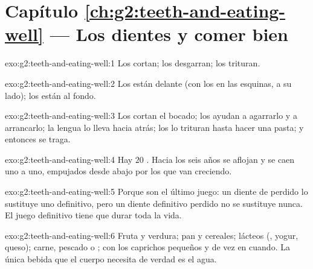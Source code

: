 \section*{Capítulo \ref{ch:g2:teeth-and-eating-well} --- Los dientes y comer bien}

\begin{solution}{exo:g2:teeth-and-eating-well:1}
Los  cortan; los  desgarran; los  trituran.
\end{solution}

\begin{solution}{exo:g2:teeth-and-eating-well:2}
Los  están delante (con los  en las esquinas, a su
lado); los  están al fondo.
\end{solution}

\begin{solution}{exo:g2:teeth-and-eating-well:3}
Los  cortan el bocado; los  ayudan a agarrarlo y a
arrancarlo; la lengua lo lleva hacia atrás; los  lo trituran
hasta hacer una pasta; y entonces se traga.
\end{solution}

\begin{solution}{exo:g2:teeth-and-eating-well:4}
Hay $20$ . Hacia los seis años se aflojan y se caen
uno a uno, empujados desde abajo por los  que van
creciendo.
\end{solution}

\begin{solution}{exo:g2:teeth-and-eating-well:5}
Porque son el último juego: un diente de  perdido lo sustituye
uno definitivo, pero un diente definitivo perdido no se sustituye
nunca. El juego definitivo tiene que durar toda la vida.
\end{solution}

\begin{solution}{exo:g2:teeth-and-eating-well:6}
Fruta y verdura; pan y cereales; lácteos (, yogur, queso); carne,
pescado o ; con los caprichos pequeños y de vez en cuando. La
única bebida que el cuerpo necesita de verdad es el agua.
\end{solution}

